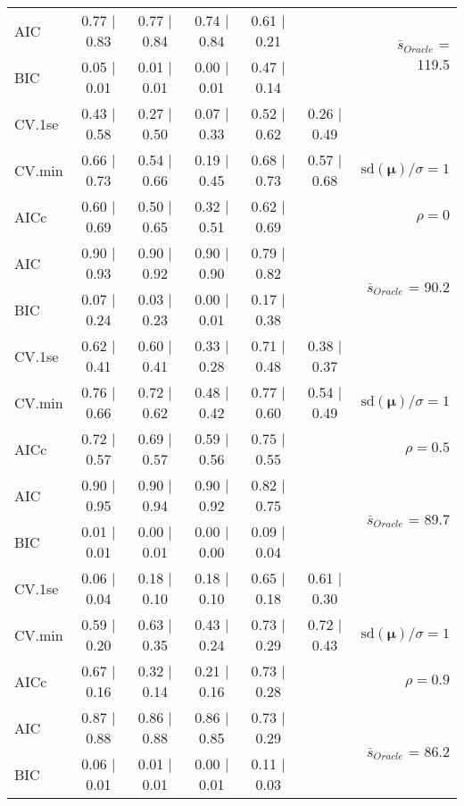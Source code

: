 \begin{table}
\begin{center}
\begin{tabular}{l*{5}{c}|r}
AIC & 0.77 $\mid$ 0.83 & 0.77 $\mid$ 0.84 & 0.74 $\mid$ 0.84 & 0.61 $\mid$ 0.21 & &  \multirow{2}{*}{$\bar{s}_{Oracle}$ = 119.5} \\
BIC & 0.05 $\mid$ 0.01 & 0.01 $\mid$ 0.01 & 0.00 $\mid$ 0.01 & 0.47 $\mid$ 0.14 & &  \\
 \hline 
CV.1se & 0.43 $\mid$ 0.58 & 0.27 $\mid$ 0.50 & 0.07 $\mid$ 0.33 & 0.52 $\mid$ 0.62 & 0.26 $\mid$ 0.49 & \\
CV.min & 0.66 $\mid$ 0.73 & 0.54 $\mid$ 0.66 & 0.19 $\mid$ 0.45 & 0.68 $\mid$ 0.73 & 0.57 $\mid$ 0.68 &  $\mathrm{sd}(\mathbf{\mu})/\sigma=1$ \\
AICc & 0.60 $\mid$ 0.69 & 0.50 $\mid$ 0.65 & 0.32 $\mid$ 0.51 & 0.62 $\mid$ 0.69 & & $\rho=0$ \\
AIC & 0.90 $\mid$ 0.93 & 0.90 $\mid$ 0.92 & 0.90 $\mid$ 0.90 & 0.79 $\mid$ 0.82 & &  \multirow{2}{*}{$\bar{s}_{Oracle}$ = 90.2} \\
BIC & 0.07 $\mid$ 0.24 & 0.03 $\mid$ 0.23 & 0.00 $\mid$ 0.01 & 0.17 $\mid$ 0.38 & &  \\
 \hline 
CV.1se & 0.62 $\mid$ 0.41 & 0.60 $\mid$ 0.41 & 0.33 $\mid$ 0.28 & 0.71 $\mid$ 0.48 & 0.38 $\mid$ 0.37 & \\
CV.min & 0.76 $\mid$ 0.66 & 0.72 $\mid$ 0.62 & 0.48 $\mid$ 0.42 & 0.77 $\mid$ 0.60 & 0.54 $\mid$ 0.49 &  $\mathrm{sd}(\mathbf{\mu})/\sigma=1$ \\
AICc & 0.72 $\mid$ 0.57 & 0.69 $\mid$ 0.57 & 0.59 $\mid$ 0.56 & 0.75 $\mid$ 0.55 & & $\rho=0.5$ \\
AIC & 0.90 $\mid$ 0.95 & 0.90 $\mid$ 0.94 & 0.90 $\mid$ 0.92 & 0.82 $\mid$ 0.75 & &  \multirow{2}{*}{$\bar{s}_{Oracle}$ = 89.7} \\
BIC & 0.01 $\mid$ 0.01 & 0.00 $\mid$ 0.01 & 0.00 $\mid$ 0.00 & 0.09 $\mid$ 0.04 & &  \\
 \hline 
CV.1se & 0.06 $\mid$ 0.04 & 0.18 $\mid$ 0.10 & 0.18 $\mid$ 0.10 & 0.65 $\mid$ 0.18 & 0.61 $\mid$ 0.30 & \\
CV.min & 0.59 $\mid$ 0.20 & 0.63 $\mid$ 0.35 & 0.43 $\mid$ 0.24 & 0.73 $\mid$ 0.29 & 0.72 $\mid$ 0.43 &  $\mathrm{sd}(\mathbf{\mu})/\sigma=1$ \\
AICc & 0.67 $\mid$ 0.16 & 0.32 $\mid$ 0.14 & 0.21 $\mid$ 0.16 & 0.73 $\mid$ 0.28 & & $\rho=0.9$ \\
AIC & 0.87 $\mid$ 0.88 & 0.86 $\mid$ 0.88 & 0.86 $\mid$ 0.85 & 0.73 $\mid$ 0.29 & &  \multirow{2}{*}{$\bar{s}_{Oracle}$ = 86.2} \\
BIC & 0.06 $\mid$ 0.01 & 0.01 $\mid$ 0.01 & 0.00 $\mid$ 0.01 & 0.11 $\mid$ 0.03 & &  \\

\end{tabular}
\end{center}
\end{table}
